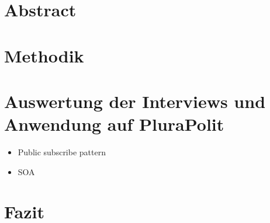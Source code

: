 \documentclass[a4paper, 12pt, headsepline]{scrartcl}
\begin{document}


\newpage
{}

\section*{Abstract}

\newpage

\tableofcontents

\newpage
{}
\setcounter{page}{1}


\newpage



\section{Methodik}
\section{Auswertung der Interviews und Anwendung auf PluraPolit}
\begin{itemize}
	\item Public subscribe pattern
	\item SOA 
\end{itemize}

\section{Fazit}

\newpage

\printbibliography[title=Literaturverzeichnis]

\newpage


\end{document}

